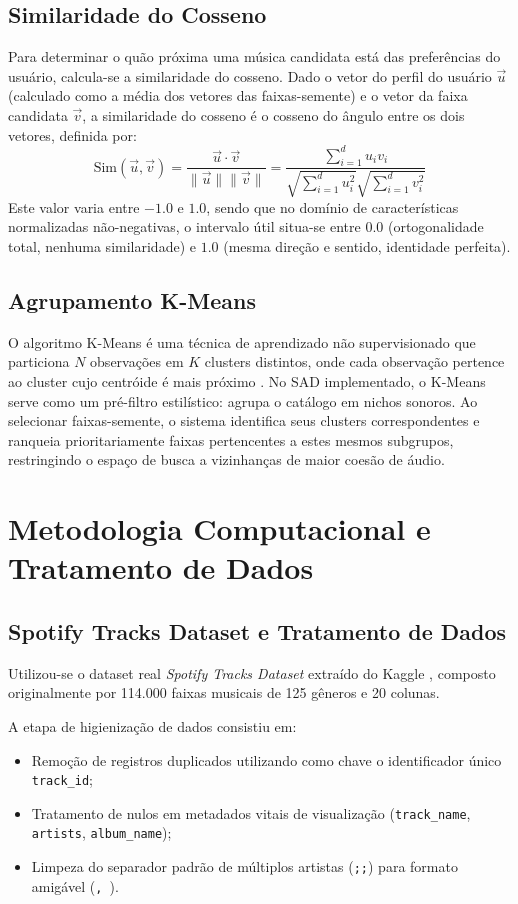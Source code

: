 \documentclass[12pt]{article}
\begin{document}
\subsection{Similaridade do Cosseno}
Para determinar o quão próxima uma música candidata está das preferências do usuário, calcula-se a similaridade do cosseno. Dado o vetor do perfil do usuário $\vec{u}$ (calculado como a média dos vetores das faixas-semente) e o vetor da faixa candidata $\vec{v}$, a similaridade do cosseno é o cosseno do ângulo entre os dois vetores, definida por:
\begin{equation}
    \text{Sim}(\vec{u}, \vec{v}) = \frac{\vec{u} \cdot \vec{v}}{\|\vec{u}\| \|\vec{v}\|} = \frac{\sum_{i=1}^{d} u_i v_i}{\sqrt{\sum_{i=1}^{d} u_i^2} \sqrt{\sum_{i=1}^{d} v_i^2}}
\end{equation}
Este valor varia entre $-1.0$ e $1.0$, sendo que no domínio de características normalizadas não-negativas, o intervalo útil situa-se entre $0.0$ (ortogonalidade total, nenhuma similaridade) e $1.0$ (mesma direção e sentido, identidade perfeita).

\subsection{Agrupamento K-Means}
O algoritmo K-Means é uma técnica de aprendizado não supervisionado que particiona $N$ observações em $K$ clusters distintos, onde cada observação pertence ao cluster cujo centróide é mais próximo \cite{macqueen1967some}. No SAD implementado, o K-Means serve como um pré-filtro estilístico: agrupa o catálogo em nichos sonoros. Ao selecionar faixas-semente, o sistema identifica seus clusters correspondentes e ranqueia prioritariamente faixas pertencentes a estes mesmos subgrupos, restringindo o espaço de busca a vizinhanças de maior coesão de áudio.

\section{Metodologia Computacional e Tratamento de Dados}
\subsection{Spotify Tracks Dataset e Tratamento de Dados}
Utilizou-se o dataset real \textit{Spotify Tracks Dataset} extraído do Kaggle \cite{spotify_dataset}, composto originalmente por 114.000 faixas musicais de 125 gêneros e 20 colunas.

A etapa de higienização de dados consistiu em:
\begin{itemize}
    \item Remoção de registros duplicados utilizando como chave o identificador único \texttt{track\_id};
    \item Tratamento de nulos em metadados vitais de visualização (\texttt{track\_name}, \texttt{artists}, \texttt{album\_name});
    \item Limpeza do separador padrão de múltiplos artistas (\texttt{;;}) para formato amigável (\texttt{, }).
\end{itemize}
\end{document}
